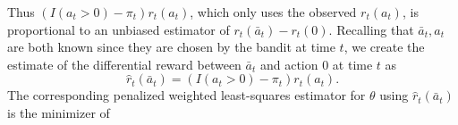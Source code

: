\documentclass{article}
\begin{document}
Thus $(I(a_t>0) - \pi_t) r_t(a_t) $, which only uses the observed $r_t(a_t)$, is proportional to an unbiased estimator of $r_t(\bar{a}_t) - r_t(0)$. Recalling that $\bar{a}_t, a_t$ are both known since they are chosen by the bandit at time $t$, we create the estimate of the differential reward between $\bar{a}_t$ and action 0 at time $t$ as
\[
\hat{r}_t(\bar{a}_t) = (I(a_t>0) - \pi_t) r_t(a_t).
\]
The corresponding penalized weighted least-squares estimator for $\theta$ using $\hat{r}_t (\bar{a}_t)$ is the minimizer of
\end{document}
